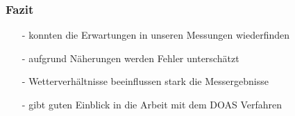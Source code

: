 \documentclass{beamer}
\begin{document}
\begin{frame}
	\frametitle{Fazit}
		\begin{itemize}
			\item[-] konnten die Erwartungen in unseren Messungen wiederfinden  
			 \pause
			\item[-] aufgrund Näherungen werden Fehler unterschätzt
			 \pause
			\item[-] Wetterverhältnisse beeinflussen stark die Messergebnisse
			 \pause
			\item[-] gibt guten Einblick in die Arbeit mit dem DOAS Verfahren
		\end{itemize}
\end{frame}
\end{document}
